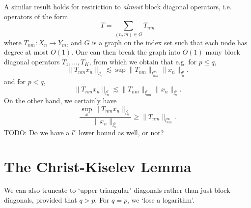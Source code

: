 A similar result holds for restriction to \emph{almost} block diagonal operators, i.e. operators of the form
%
\[ T = \sum_{(n,m) \in G} T_{nm} \]
%
where $T_{nm}: X_n \to Y_m$, and $G$ is a graph on the index set such that each node has degree at most $O(1)$. One can then break the graph into $O(1)$ many block diagonal operators $T_1, \dots, T_K$, from which we obtain that e.g. for $p \leq q$,
%
\[ \| T_{nm} x_n \|_{l^q_n} \lesssim \sup \| T_{nm} \|_{l^\infty_{nm}} \| x_n \|_{l^p_n}. \]
%
and for $p < q$,
%
\[ \| T_{nm} x_n \|_{l^q_n} \lesssim \| T_{nm} \|_{l^r_{nm}} \| x_n \|_{l^p_n}. \]
%
On the other hand, we certainly have 
%
\[ \frac{\sup_x \| T_{nm} x_n \|_{l^q_n}}{\| x_n \|_{l^p_n}} \geq \| T_{nm} \|_{l^\infty_{nm}}. \]
%
TODO: Do we have a $l^r$ lower bound as well, or not?

\section{The Christ-Kiselev Lemma}

We can also truncate to `upper triangular' diagonals rather than just block diagonals, provided that $q > p$. For $q = p$, we `lose a logarithm'.

